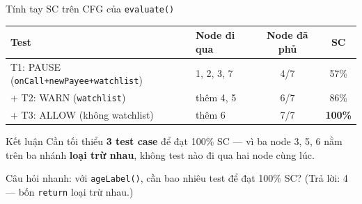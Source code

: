 \documentclass[aspectratio=169,12pt]{beamer}
\begin{document}
\begin{frame}[shrink=8]{Tính tay SC trên CFG của \texttt{evaluate()}}
  \small
  \renewcommand{\arraystretch}{1.3}
  \begin{tabularx}{\textwidth}{lXcc}
    \toprule
    \textbf{Test} & \textbf{Node đi qua} & \textbf{Node đã phủ} & \textbf{SC} \\
    \midrule
    T1: PAUSE (\texttt{onCall+newPayee+watchlist}) & 1, 2, 3, 7 & 4/7 & 57\% \\
    + T2: WARN (\texttt{watchlist}) & thêm 4, 5 & 6/7 & 86\% \\
    + T3: ALLOW (không watchlist) & thêm 6 & 7/7 & \textbf{100\%} \\
    \bottomrule
  \end{tabularx}
  \renewcommand{\arraystretch}{1}

  \vspace{0.5em}
  \begin{block}{Kết luận}
    Cần tối thiểu \textbf{3 test case} để đạt 100\% SC --- vì ba node
    3, 5, 6 nằm trên ba nhánh \textbf{loại trừ nhau}, không test nào
    đi qua hai node cùng lúc.
  \end{block}

  \vspace{0.3em}
  {\small Câu hỏi nhanh: với \texttt{ageLabel()}, cần bao nhiêu test để đạt
  100\% SC? (Trả lời: 4 --- bốn \texttt{return} loại trừ nhau.)}
\end{frame}
\end{document}

